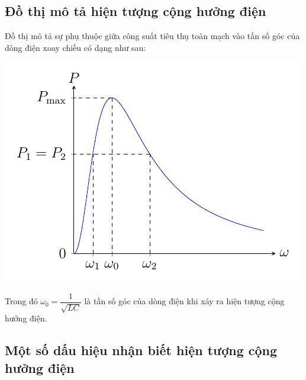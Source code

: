 \subsection{Đồ thị mô tả hiện tượng cộng hưởng điện}
Đồ thị mô tả sự phụ thuộc giữa công suất tiêu thụ toàn mạch vào tần số góc của dòng điện xoay chiều có dạng như sau:
\begin{center}
	\includegraphics[scale=1,angle=0,clip=true,trim= 0mm 0 0 0]{../figs/VN12-PH-19-L-012-1-V2-1.pdf}
\end{center}
Trong đó $\omega_0=\dfrac{1}{\sqrt{LC}}$ là tần số góc của dòng điện khi xảy ra hiện tượng cộng hưởng điện.
\subsection{Một số dấu hiệu nhận biết hiện tượng cộng hưởng điện}

